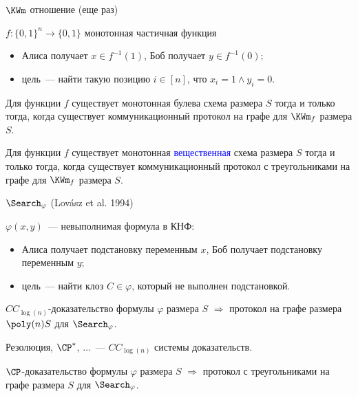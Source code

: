 \begin{frame}{$\KWm$ отношение (еще раз)}

    $f:\{0, 1\}^n \to \{0, 1\}$ монотонная частичная функция
    
    \begin{itemize}
        \item Алиса получает $x \in f^{-1}(1)$, Боб получает $y \in f^{-1}(0)$;
        \item цель~--- найти такую позицию $i \in [n]$, что $x_i = 1 \land y_i = 0$.
    \end{itemize}

    \pause

    \begin{theorem}
        Для функции $f$ существует монотонная булева \alert{схема} размера $S$ тогда и только тогда, когда
        существует коммуникационный протокол \alert{на графе} для $\KWm_f$ размера $S$.
    \end{theorem}

    \pause

    \begin{theorem}
        Для функции $f$ существует монотонная \textcolor{blue}{вещественная} схема размера $S$ тогда и
        только тогда, когда существует коммуникационный протокол с треугольниками на графе для $\KWm_f$
        размера $S$.
    \end{theorem}
\end{frame}


\begin{frame}{$\Search_{\varphi}$ (Lov{\'{a}}sz et al. 1994)}
    
    $\varphi(x, y)$~--- невыполнимая формула в КНФ:
    \begin{itemize}
        \item Алиса получает подстановку переменным $x$, Боб получает подстановку переменным $y$;
        \item цель~--- найти клоз $C \in \varphi$, который не выполнен подстановкой.
    \end{itemize}

    \pause

    \begin{theorem}[Kraj{\'{\i}}{\v{c}}ek 95; С 17]
        $CC_{\log(n)}$-доказательство формулы $\varphi$ размера $S$ $\Rightarrow$ протокол на графе
        размера $\poly(n) S$ для $\Search_{\varphi}$.
    \end{theorem}

    Резолюция, $\CP^*$, $\dots$~--- $CC_{\log(n)}$ системы доказательств.

    \pause
    
    \begin{theorem}[С 17]
        $\CP$-доказательство формулы $\varphi$ размера $S$ $\Rightarrow$ протокол с треугольниками на
        графе размера $S$ для $\Search_{\varphi}$.
    \end{theorem}
\end{frame}